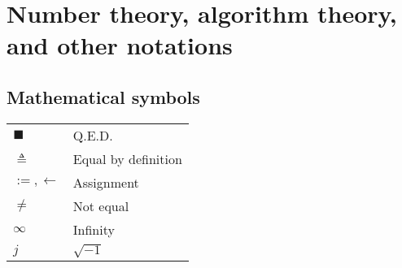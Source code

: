\documentclass{article}
\begin{document}
\section{Number theory, algorithm theory, and other notations}
\subsection{Mathematical symbols}
\begin{xltabular}{\textwidth}{XX}
    \(\blacksquare\) & Q.E.D. \\
    \(\triangleq\) & Equal by definition\\
    \(:=, \leftarrow\) & Assignment \cite{rosenDiscreteMathematicsIts2011}\\
    \(\neq\) & Not equal\\
    \(\infty\) & Infinity\\
    \(j\) & \(\sqrt{-1}\)\\
\end{xltabular}
\end{document}
